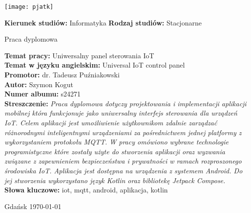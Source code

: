\thispagestyle{empty}

\vspace*{2em}

\begin{center}
    \texttt{[image: pjatk]}
\end{center}

\vspace{2em}

\textbf{Kierunek studiów:} Informatyka
\hfill
\textbf{Rodzaj studiów:} Stacjonarne

\vspace{2em}

\begin{center}
    \Huge
    Praca dyplomowa
\end{center}

\vspace{3em}

\textbf{Temat pracy:} Uniwersalny panel sterowania IoT\\
\textbf{Temat w języku angielskim:} Universal IoT control panel\\
\textbf{Promotor:} dr. Tadeusz Puźniakowski\\

\textbf{Autor:} Szymon Kogut\\
\textbf{Numer albumu:} s24271\\

\textbf{Streszczenie:}
\textsl{Praca dyplomowa dotyczy projektowania i implementacji aplikacji mobilnej która funkcjonuje jako uniwersalny interfejs sterowania dla urządzeń IoT. Celem aplikacji jest umożliwienie użytkownikom zdalnie zarządzać różnorodnymi inteligentnymi urządzeniami za pośrednictwem jednej platformy z wykorzystaniem protokołu MQTT. W pracy omówiono wybrane technologie programistyczne które zostały użyte do stworzenia aplikacji oraz wyzwania związane z zapewnieniem bezpieczeństwa i prywatności w ramach rozproszonego środowiska IoT. Aplikacja jest dostępna na urządzenia z systemem Android. Do jej stworzenia wykorzystano język Kotlin oraz bibliotekę Jetpack Compose.}\\

\textbf{Słowa kluczowe:} iot, mqtt, android, aplikacja, kotlin

\vfill

\begin{center}
    Gdańsk \today
\end{center}